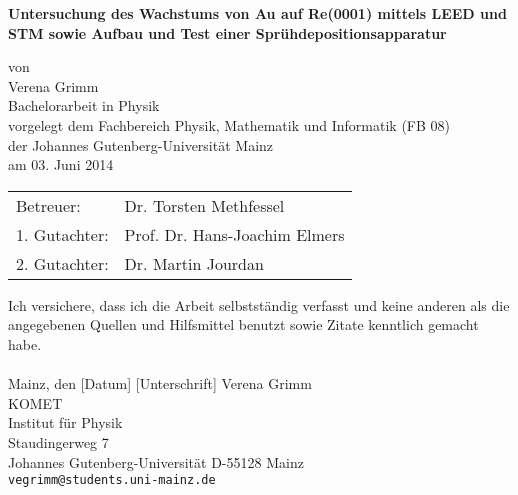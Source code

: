 \documentclass[pdftex,a4paper,german,openbib,final,11pt,twoside,chapterprefix,
headsepline]{scrbook}
\begin{document}

\begin{titlepage}
  \vspace*{6mm}
  \begin{center}
  \linespread{1.3}
     {\sffamily \bfseries \Huge  %
     Untersuchung des Wachstums von Au auf Re(0001) mittels LEED und STM
     sowie Aufbau und Test einer Sprühdepositionsapparatur\par}
     \vspace*{3.5cm}
     {\large von}
     \\[3.5cm]
     \linespread{1}
     {\dfont Verena Grimm}
     \\[2cm]
     {\large Bachelorarbeit in Physik \/\\
        vorgelegt dem Fachbereich Physik, Mathematik und Informatik (FB 08) \/\\
        der Johannes Gutenberg-Universit\"at Mainz \/\\
        am 03. Juni 2014}
   \end{center}
   \newpage
	\null
	\vfill
	\begin{tabular}{ll}
	Betreuer: & Dr. Torsten Methfessel \\
	1. Gutachter: & Prof. Dr. Hans-Joachim Elmers\\
   	2. Gutachter: & Dr. Martin Jourdan
	\end{tabular}
   
\end{titlepage}



\thispagestyle{empty}
Ich versichere, dass ich die Arbeit selbstst\"andig verfasst und keine
anderen als die angegebenen Quellen und Hilfsmittel benutzt sowie
Zitate kenntlich gemacht habe.
\\
\\[3.5cm]
Mainz, den [Datum] [Unterschrift]
\vfill
\noindent
Verena Grimm\\
KOMET\\
Institut f\"ur Physik\\
Staudingerweg 7\\
Johannes Gutenberg-Universit\"at
D-55128 Mainz\\
{\tt vegrimm@students.uni-mainz.de}

\renewcommand\contentsname{Inhaltsverzeichnis}
\renewcommand\figurename{Abbildung}
\renewcommand\tablename{Tabelle}
\tableofcontents
\clearpage 
\end{document}
